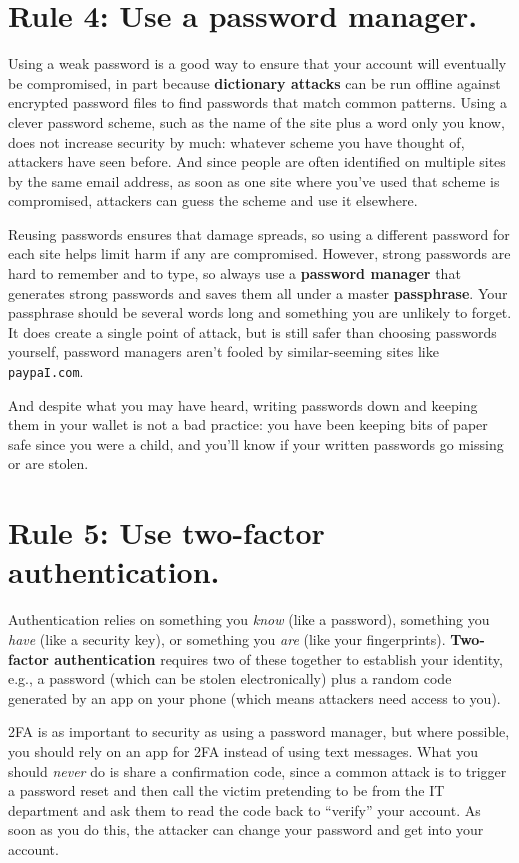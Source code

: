 \documentclass[10pt,letterpaper]{article}
\newcommand{\rulemajor}[1]{\section*{#1}}
\begin{document}
\rulemajor{Rule 4: Use a password manager.}

Using a weak password is a good way to ensure that your account will eventually be compromised,
in part because \textbf{dictionary attacks} can be run offline against encrypted password files
to find passwords that match common patterns.
Using a clever password scheme,
such as the name of the site plus a word only you know,
does not increase security by much:
whatever scheme you have thought of,
attackers have seen before.
And since people are often identified on multiple sites by the same email address,
as soon as one site where you've used that scheme is compromised,
attackers can guess the scheme and use it elsewhere.

Reusing passwords ensures that damage spreads,
so using a different password for each site helps limit harm if any are compromised.
However,
strong passwords are hard to remember and to type,
so always use a \textbf{password manager}
that generates strong passwords
and saves them all under a master \textbf{passphrase}.
Your passphrase should be several words long
and something you are unlikely to forget.
It does create a single point of attack,
but is still safer than choosing passwords yourself,
password managers aren't fooled by similar-seeming sites like \texttt{paypaI.com}.

And despite what you may have heard,
writing passwords down and keeping them in your wallet is not a bad practice:
you have been keeping bits of paper safe since you were a child,
and you'll know if your written passwords go missing or are stolen.

\rulemajor{Rule 5: Use two-factor authentication.}

Authentication relies on something you \emph{know} (like a password),
something you \emph{have} (like a security key),
or something you \emph{are} (like your fingerprints).
\textbf{Two-factor authentication} requires two of these together to establish your identity,
e.g.,
a password (which can be stolen electronically)
plus a random code generated by an app on your phone
(which means attackers need access to you).

2FA is as important to security as using a password manager,
but where possible,
you should rely on an app for 2FA instead of using text messages.
What you should \emph{never} do is share a confirmation code,
since a common attack is to trigger a password reset
and then call the victim pretending to be from the IT department
and ask them to read the code back to ``verify'' your account.
As soon as you do this,
the attacker can change your password and get into your account.
\end{document}

